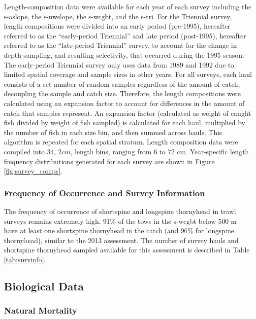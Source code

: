\documentclass[11pt,
  english,
  letterpaper,
]{article}
\begin{document}
Length-composition data were available for each year of each survey including the \gls{s-aslope}, the \gls{s-nwslope}, the \gls{s-wcgbt}, and the \gls{s-tri}. For the Triennial survey, length compositions were divided into an early period (pre-1995), hereafter referred to as the ``early-period Triennial'' and late period (post-1995), hereafter referred to as the ``late-period Triennial'' survey, to account for the change in depth-sampling, and resulting selectivity, that occurred during the 1995 season. The early-period Triennial survey only uses data from 1989 and 1992 due to limited spatial coverage and sample sizes in other years. For all surveys, each haul consists of a set number of random samples regardless of the amount of catch, decoupling the sample and catch size. Therefore, the length compositions were calculated using an expansion factor to account for differences in the amount of catch that samples represent. An expansion factor (calculated as weight of caught fish divided by weight of fish sampled) is calculated for each haul, multiplied by the number of fish in each size bin, and then summed across hauls. This algorithm is repeated for each spatial stratum. Length composition data were compiled into 34, \(2 cm\), length bins, ranging from 6 to 72 cm. Year-specific length frequency distributions generated for each survey are shown in Figure \ref{fig:survey_comps}.

\hypertarget{frequency-of-occurrence-and-survey-information}{%
\subsubsection{Frequency of Occurrence and Survey Information}\label{frequency-of-occurrence-and-survey-information}}

The frequency of occurrence of shortspine and longspine thornyhead in trawl surveys remains extremely high. 91\% of the tows in the \gls{s-wcgbt} below 500 m have at least one shortspine thornyhead in the catch (and 96\% for longspine thornyhead), similar to the 2013 assessment. The number of survey hauls and shortspine thornyhead sampled available for this assessment is described in Table \ref{tab:survinfo}.

\hypertarget{biological-data}{%
\subsection{Biological Data}\label{biological-data}}

\hypertarget{natural-mortality}{%
\subsubsection{Natural Mortality}\label{natural-mortality}}
\end{document}
